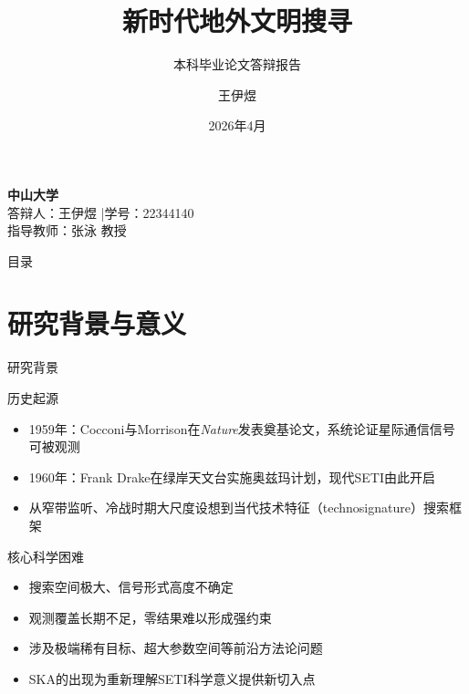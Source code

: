 \documentclass{sysupptthesis}
\author{王伊煜}
\title{新时代地外文明搜寻}
\subtitle{本科毕业论文答辩报告}
\institute{中山大学 物理与天文学院}
\date{2026年4月}
\begin{document}
\begin{frame}
    \titlepage
    \vspace*{-0.5cm}
    \begin{center}
        {\large\textbf{中山大学}}\\[0.3em]
        {\normalsize 答辩人：王伊煜 \quad|\quad 学号：22344140}\\[0.2em]
        {\normalsize 指导教师：张泳 教授}
    \end{center}
\end{frame}

\begin{frame}{目录}
    \tableofcontents[sectionstyle=show,subsectionstyle=show/shaded/hide]
\end{frame}

\section{研究背景与意义}

\begin{frame}{研究背景}
    \begin{block}{历史起源}
        \begin{itemize}
            \item 1959年：Cocconi与Morrison在\textit{Nature}发表奠基论文，系统论证星际通信信号可被观测
            \item 1960年：Frank Drake在绿岸天文台实施奥兹玛计划，现代SETI由此开启
            \item 从窄带监听、冷战时期大尺度设想到当代技术特征（technosignature）搜索框架
        \end{itemize}
    \end{block}

    \begin{block}{核心科学困难}
        \begin{itemize}
            \item 搜索空间极大、信号形式高度不确定
            \item 观测覆盖长期不足，零结果难以形成强约束
            \item 涉及极端稀有目标、超大参数空间等前沿方法论问题
            \item SKA的出现为重新理解SETI科学意义提供新切入点
        \end{itemize}
    \end{block}
\end{frame}
\end{document}
